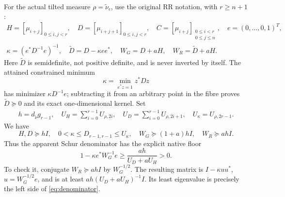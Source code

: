 \documentclass[11pt]{article}
\begin{document}
For the actual tilted measure $\rho=\widetilde\nu_\epsilon$,
use the original RR notation, with $r\ge n+1$:
\begin{equation}\label{eq:RR}
 \begin{gathered}
 H=[\mu_{i+j}]_{0\le i,j<r},\quad
 D=[\mu_{i+j+1}]_{0\le i,j<r},\quad
 C=[\mu_{i+j}]_{\substack{0\le i<r\\0\le j\le n}},\quad
 e=(0,\ldots,0,1)^T,\\
 \kappa=(e^*D^{-1}e)^{-1},\quad \widetilde D=D-\kappa ee^*,
 \quad W_G=D+aH,\quad W_R=\widetilde D+aH.
 \end{gathered}
\end{equation}
Here $\widetilde D$ is semidefinite, not positive definite, and
is never inverted by itself. The attained constrained minimum
\begin{equation}\label{eq:kmin}
 \kappa=\min_{e^*z=1}z^*Dz
\end{equation}
has minimizer $\kappa D^{-1}e$; subtracting it from an arbitrary
point in the fibre proves $\widetilde D\succeq0$ and its exact
one-dimensional kernel. Set
\begin{equation}\label{eq:RRconstants}
 \begin{gathered}
 h=d_{\widetilde\nu}g_{r-1},\quad
 U_H=\sum_{i=0}^{r-1}U_{\rho,2i},\quad
 U_D=\sum_{i=0}^{r-1}U_{\rho,2i+1},\quad U_\kappa=U_{\rho,2r-1}.
 \end{gathered}
\end{equation}
We have
\begin{equation}\label{eq:radaufloor}
 H,D\succeq hI,\quad 0<\kappa\le D_{r-1,r-1}\le U_\kappa,
 \quad W_G\succeq(1+a)hI,\quad W_R\succeq ahI.
\end{equation}
Thus the apparent Schur denominator has the explicit native floor
\begin{equation}\label{eq:denominator}
 \boxed{1-\kappa e^*W_G^{-1}e\ge
                    \frac{ah}{U_D+aU_H}>0.}
\end{equation}
To check it, conjugate $W_R\succeq ahI$ by $W_G^{-1/2}$.
The resulting matrix is $I-\kappa uu^*$, $u=W_G^{-1/2}e$,
and is at least $ah(U_D+aU_H)^{-1}I$. Its least eigenvalue
is precisely the left side of \eqref{eq:denominator}.
\end{document}
